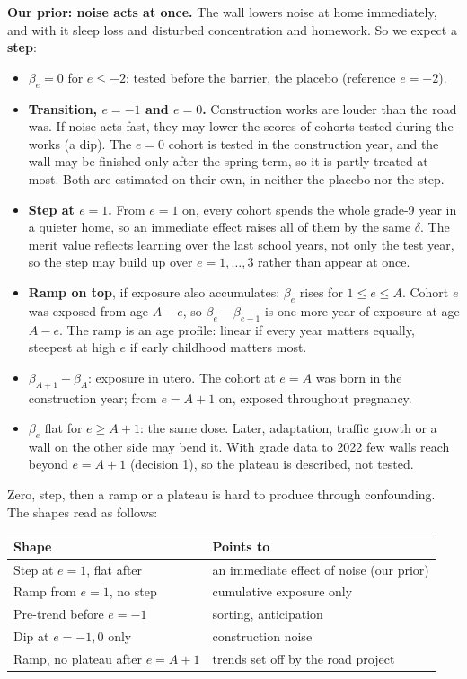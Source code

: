 \documentclass[11pt]{article}
\begin{document}
\textbf{Our prior: noise acts at once.} The wall lowers noise at home immediately, and with it
sleep loss and disturbed concentration and homework. So we expect a \textbf{step}:
\begin{itemize}
\item \(\beta_e = 0\) for \(e \le -2\): tested before the barrier, the placebo (reference
  \(e = -2\)).
\item \textbf{Transition, \(e = -1\) and \(e = 0\).} Construction works are louder than the road
  was. If noise acts fast, they may lower the scores of cohorts tested during the works (a dip).
  The \(e = 0\) cohort is tested in the construction year, and the wall may be finished only
  after the spring term, so it is partly treated at most. Both are estimated on their own, in
  neither the placebo nor the step.
\item \textbf{Step at \(e = 1\).} From \(e = 1\) on, every cohort spends the whole grade-9 year
  in a quieter home, so an immediate effect raises all of them by the same \(\delta\). The
  merit value reflects learning over the last school years, not only the test year, so the step
  may build up over \(e = 1, \dots, 3\) rather than appear at once.
\item \textbf{Ramp on top}, if exposure also accumulates: \(\beta_e\) rises for
  \(1 \le e \le A\). Cohort \(e\) was exposed from age \(A - e\), so
  \(\beta_e - \beta_{e-1}\) is one more year of exposure at age \(A - e\). The ramp is an age
  profile: linear if every year matters equally, steepest at high \(e\) if early childhood
  matters most.
\item \(\beta_{A+1} - \beta_A\): exposure in utero. The cohort at \(e = A\) was born in the
  construction year; from \(e = A + 1\) on, exposed throughout pregnancy.
\item \(\beta_e\) flat for \(e \ge A + 1\): the same dose. Later, adaptation, traffic growth or a
  wall on the other side may bend it. With grade data to 2022 few walls reach beyond
  \(e = A + 1\) (decision 1), so the plateau is described, not tested.
\end{itemize}

Zero, step, then a ramp or a plateau is hard to produce through confounding. The shapes read as
follows:

\begin{center}
\small
\begin{tabular}{@{}ll@{}}
\toprule
\textbf{Shape} & \textbf{Points to} \\
\midrule
Step at \(e = 1\), flat after & an immediate effect of noise (our prior) \\
Ramp from \(e = 1\), no step & cumulative exposure only \\
Pre-trend before \(e = -1\) & sorting, anticipation \\
Dip at \(e = -1, 0\) only & construction noise \\
Ramp, no plateau after \(e = A + 1\) & trends set off by the road project \\
\bottomrule
\end{tabular}
\end{center}
\end{document}

